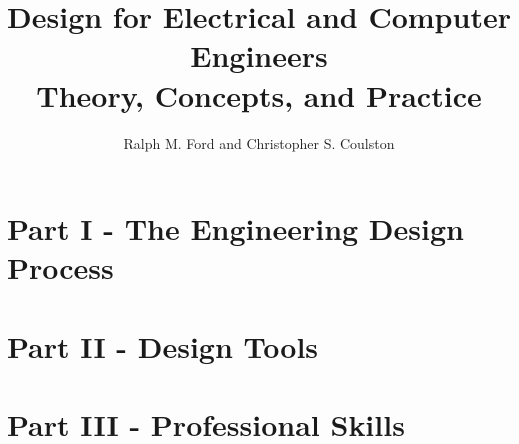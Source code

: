 \documentclass[letterpaper, 10pt]{memoir}
\begin{document}
\frontmatter
\title{{\Huge Design for Electrical and Computer Engineers} \\
				Theory, Concepts, and Practice}
\author{Ralph M. Ford and Christopher S. Coulston}
\date{}
\maketitle





\tableofcontents


\mainmatter 					%

\chapter*{Part I - The Engineering Design Process }













\chapter*{Part II - Design Tools}













\chapter*{Part III - Professional Skills}






\end{document}
